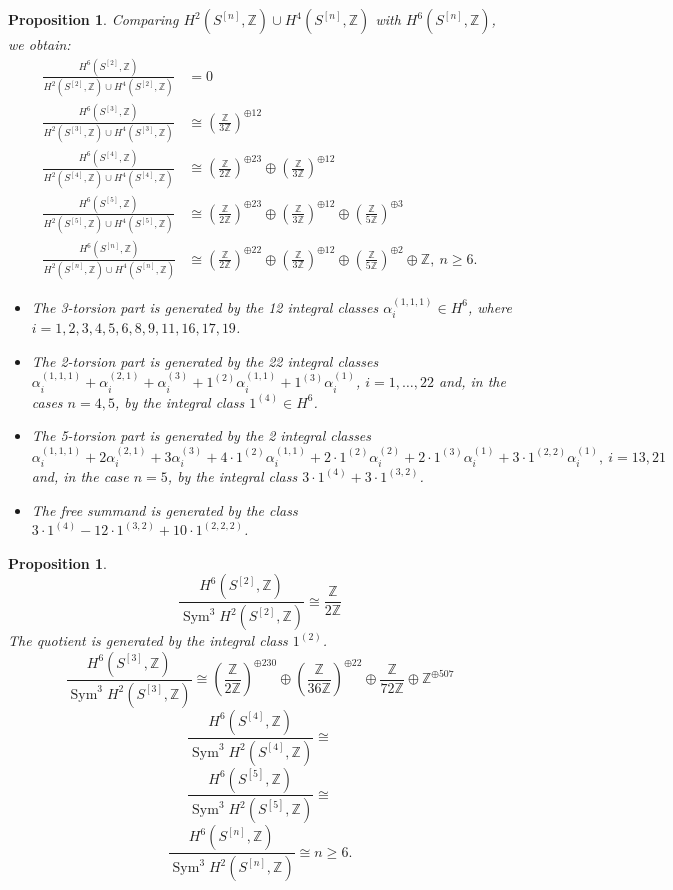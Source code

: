 \documentclass{amsart}
\DeclareMathOperator{\Sym}{Sym}
\newcommand{\hilb}[1]{^{[#1]}}
\newcommand{\IZ}{\mathbb{Z}}
\theoremstyle{plain}
\newtheorem{proposition}[theorem]{Proposition}
\theoremstyle{definition}
\theoremstyle{remark}
\begin{document}
\begin{proposition} Comparing $H^2(S\hilb{n},\IZ) \cup H^4(S\hilb{n},\IZ) $ with $H^6(S\hilb{n},\IZ) $, we obtain:
\begin{align} 
\frac{H^6(S\hilb{2},\IZ) }{H^2(S\hilb{2},\IZ)\cup H^4(S\hilb{2},\IZ)} &= 0 
\\
\frac{H^6(S\hilb{3},\IZ)}{H^2(S\hilb{3},\IZ)\cup H^4(S\hilb{3},\IZ)} &\cong \left(\frac{\IZ}{3\IZ}\right)^{\oplus 12} 
\\
\frac{H^6(S\hilb{4},\IZ)}{H^2(S\hilb{4},\IZ)\cup H^4(S\hilb{4},\IZ)} &\cong \left(\frac{\IZ}{2\IZ}\right)^{\oplus 23} \oplus \left(\frac{\IZ}{3\IZ}\right)^{\oplus 12} 
\\
\frac{H^6(S\hilb{5},\IZ)}{H^2(S\hilb{5},\IZ)\cup H^4(S\hilb{5},\IZ)} &\cong \left(\frac{\IZ}{2\IZ}\right)^{\oplus 23} \oplus \left(\frac{\IZ}{3\IZ}\right)^{\oplus 12} \oplus \left(\frac{\IZ}{5\IZ}\right)^{\oplus 3} 
\\
\frac{H^6(S\hilb{n},\IZ)}{H^2(S\hilb{n},\IZ)\cup H^4(S\hilb{n},\IZ)} &\cong \left(\frac{\IZ}{2\IZ}\right)^{\oplus 22} \oplus \left(\frac{\IZ}{3\IZ}\right)^{\oplus 12} \oplus \left(\frac{\IZ}{5\IZ}\right)^{\oplus 2}\oplus \IZ, \ n\geq 6.
\end{align}
\begin{itemize}
\item The 3-torsion part is generated by the 12 integral classes $\alpha_i^{(1,1,1)}\in H^6$, where $ i = 1,2,3,4,5,6,8,9,11,16,17,19$.
\item The 2-torsion part is generated by the 22 integral classes $\alpha_i^{(1,1,1)} +\alpha_i^{(2,1)} + \alpha_i^{(3)}+ 1^{(2)}\alpha_i^{(1,1)}+1^{(3)}\alpha_i^{(1)} $, $i=1,\ldots,22$ and, in the cases $n=4,5$, by the integral class $1^{(4)}\in H^6$.
\item The 5-torsion part is generated by the 2 integral classes
$\alpha_i^{(1,1,1)}+2\alpha_i^{(2,1)}+3\alpha_i^{(3)}+ 4\cdot 1^{(2)}\alpha_i^{(1,1)} +  2\cdot 1^{(2)} \alpha_i^{(2)}+ 2\cdot 1^{(3)}\alpha_i^{ (1)} + 3\cdot 1^{(2,2)}\alpha_i^{(1)},\ i =13,21$ 
and, in the case $n=5$, by the integral class $3\cdot 1^{(4)}+3\cdot1^{(3,2)}$.
\item The free summand is generated by the class $3\cdot 1^{(4)} - 12\cdot 1^{(3,2)}+10\cdot 1^{(2,2,2)}$.
\end{itemize}
\end{proposition}
\begin{proposition}
$$
\frac{H^6(S\hilb{2},\IZ)}{\Sym^3 H^2(S\hilb{2},\IZ)} \cong 
\frac{\IZ}{2\IZ}
$$
The quotient is generated by the integral class $1^{(2)}$.
$$
\frac{H^6(S\hilb{3},\IZ)}{\Sym^3 H^2(S\hilb{3},\IZ)} \cong  \left(\frac{\IZ}{2\IZ}\right)^{\oplus 230}\oplus \left(\frac{\IZ}{36\IZ}\right)^{\oplus 22}\oplus \frac{\IZ}{72\IZ} \oplus \IZ^{\oplus 507}
$$
$$
\frac{H^6(S\hilb{4},\IZ)}{\Sym^3 H^2(S\hilb{4},\IZ)} \cong  
$$
$$
\frac{H^6(S\hilb{5},\IZ)}{\Sym^3 H^2(S\hilb{5},\IZ)} \cong  
$$
$$
\frac{H^6(S\hilb{n},\IZ)}{\Sym^3 H^2(S\hilb{n},\IZ)} \cong   n\geq 6.
$$
\end{proposition}



\end{document}
